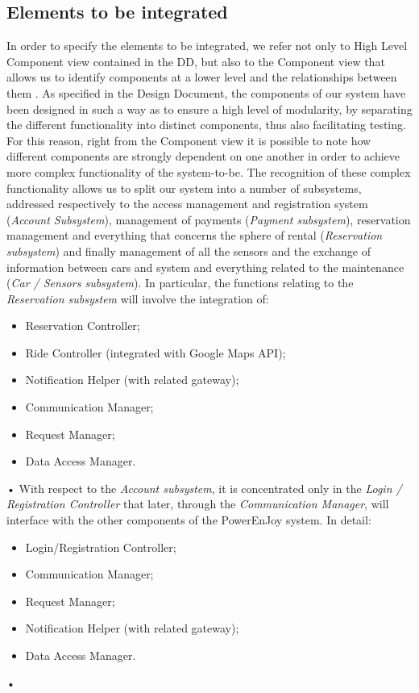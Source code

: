 \documentclass[10pt, a4paper,titlepage]{article}
\begin{document}
\subsection{Elements to be integrated}
In order to specify the elements to be integrated, we refer not only to High Level Component view contained in the DD, but also to the Component view that allows us to identify components at a lower level and the relationships between them .
As specified in the Design Document, the components of our system have been designed in such a way as to ensure a high level of modularity, by separating the different functionality into distinct components, thus also facilitating testing.
For this reason, right from the Component view it is possible to note how different components are strongly dependent on one another in order to achieve more complex functionality of the system-to-be.
The recognition of these complex functionality allows us to split our system into a number of subsystems, addressed respectively to the access management and registration system (\emph{Account Subsystem}), management of payments (\emph{Payment subsystem}), reservation management and everything that concerns the sphere of rental (\emph{Reservation subsystem}) and finally management of all the sensors and the exchange of information between cars and system and everything related to the maintenance (\emph{Car / Sensors subsystem}).
In particular, the functions relating to the \emph{Reservation subsystem} will involve the integration of:
\begin{itemize}
\item Reservation Controller;
\item Ride Controller (integrated with Google Maps API);
\item Notification Helper (with related gateway);
\item Communication Manager;
\item Request Manager;
\item Data Access Manager.
\end{itemize}•
With respect to the \emph{Account subsystem}, it is concentrated only in the \emph{Login / Registration Controller} that later, through the \emph{Communication Manager}, will interface with the other components of the PowerEnJoy system. In detail:
\begin{itemize}
\item Login/Registration Controller;
\item Communication Manager;
\item Request Manager;
\item Notification Helper (with related gateway);
\item Data Access Manager.
\end{itemize}•
\end{document}
